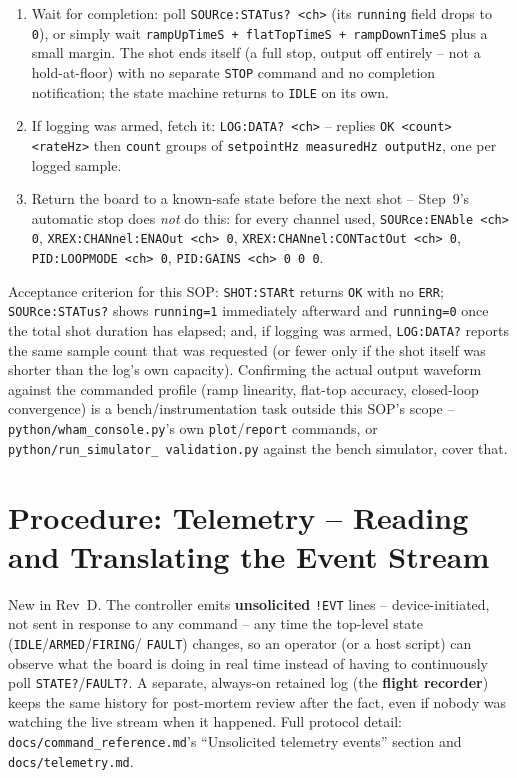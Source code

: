 \documentclass[11pt]{article}
\newcommand{\code}[1]{\texttt{#1}}
\begin{document}
\begin{enumerate}[label=\arabic*.]
\begin{enumerate}[label=(\alph*)]
        reports nothing back over serial; it just silently stays
        \code{ARMED}.
    \end{enumerate}
  \item Wait for completion: poll \code{SOURce:STATus? <ch>} (its
    \code{running} field drops to \code{0}), or simply wait
    \code{rampUpTimeS + flatTopTimeS + rampDownTimeS} plus a small
    margin. The shot ends itself (a full stop, output off entirely --
    not a hold-at-floor) with no separate \code{STOP} command and no
    completion notification; the state machine returns to \code{IDLE}
    on its own.
  \item If logging was armed, fetch it: \code{LOG:DATA? <ch>} --
    replies \code{OK <count> <rateHz>} then \code{count} groups of
    \code{setpointHz measuredHz outputHz}, one per logged sample.
  \item Return the board to a known-safe state before the next shot --
    Step~9's automatic stop does \emph{not} do this: for every channel
    used, \code{SOURce:ENAble <ch> 0}, \code{XREX:CHANnel:ENAOut
    <ch> 0}, \code{XREX:CHANnel:CONTactOut <ch> 0}, \code{PID:LOOPMODE
    <ch> 0}, \code{PID:GAINS <ch> 0 0 0}.
\end{enumerate}

Acceptance criterion for this SOP: \code{SHOT:STARt} returns
\code{OK} with no \code{ERR}; \code{SOURce:STATus?} shows \code{running=1}
immediately afterward and \code{running=0} once the total shot duration
has elapsed; and, if logging was armed, \code{LOG:DATA?} reports the
same sample count that was requested (or fewer only if the shot itself
was shorter than the log's own capacity). Confirming the actual output
waveform against the commanded profile (ramp linearity, flat-top
accuracy, closed-loop convergence) is a bench/instrumentation task
outside this SOP's scope -- \code{python/wham\_console.py}'s own
\code{plot}/\code{report} commands, or \code{python/run\_simulator\_
validation.py} against the bench simulator, cover that.

\section{Procedure: Telemetry -- Reading and Translating the Event Stream}
\label{sec:telemetry}

New in Rev~D. The controller emits \textbf{unsolicited} \code{!EVT}
lines -- device-initiated, not sent in response to any command -- any
time the top-level state (\code{IDLE}/\code{ARMED}/\code{FIRING}/
\code{FAULT}) changes, so an operator (or a host script) can observe
what the board is doing in real time instead of having to continuously
poll \code{STATE?}/\code{FAULT?}. A separate, always-on retained log
(the \textbf{flight recorder}) keeps the same history for post-mortem
review after the fact, even if nobody was watching the live stream when
it happened. Full protocol detail: \code{docs/command\_reference.md}'s
``Unsolicited telemetry events'' section and \code{docs/telemetry.md}.
\end{document}
